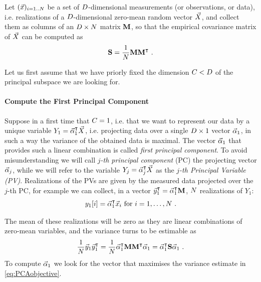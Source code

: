Let $(\vec{x})_{i=1..N}$ be a set of $D$-dimensional measurements (or observations, or data), i.e. realizations of a $D$-dimensional zero-mean random vector $\vec{X}{}$, and collect them as columns of an $D \times N$ matrix $\textbf{M}$, so that the empirical covariance matrix of $\vec{X}{}$ can be computed as 
\begin{equation}\label{eq:covmat}
\textbf{S} = \frac{1}{N}\textbf{M}\textbf{M}^\intercal \mbox{ .}
\end{equation}

Let us first assume that we have priorly fixed the dimension $C<D$ of the principal subspace we are looking for. 

\paragraph*{Compute the First Principal Component}
Suppose in a first time that $C = 1$, i.e. that we want to represent our data by a unique variable $Y_1 =  \vec{\alpha}_1^\intercal \vec{X}{}$, i.e. projecting data over a single $D\times 1$ vector $\vec{\alpha}_1$, in such a way the variance of the obtained data is maximal. The vector $\vec{\alpha}_1$ that provides such a linear combination is called {\em first principal component}. 
To avoid misunderstanding we will call {\em $j$-th principal component} (PC) the projecting vector $\vec{\alpha}_j$, while we will refer to the variable $Y_j = \vec{\alpha}_j^\intercal \vec{X}$ as the {\em $j$-th Principal Variable (PV)}. 
Realizations of the PVs are given by the measured data projected over the $j$-th PC, for example we can collect, in a vector $\vec{y}_1^\intercal = \vec{\alpha}_1^\intercal \textbf{M} $, $N $ realizations of $Y_1$:
\begin{equation}
y_1[i] = \vec{\alpha}_1^\intercal \vec{x}_i \mbox{ for } i=1,\dots , N \mbox{ .}
\end{equation}

The mean of these realizations will be zero as they are linear combinations of zero-mean variables, and the variance turns to be estimable as
\begin{equation}\label{eq:PCAobjective}
\frac{1}{N}\vec{y}_1\vec{y}_1^\intercal = \frac{1}{N}\vec{\alpha}_1^\intercal\textbf{M}\textbf{M}^\intercal\vec{\alpha}_1 = \vec{\alpha}_1^\intercal\textbf{S}\vec{\alpha}_1 \mbox{ .}
\end{equation}
To compute $\vec{\alpha}_1$ we look for the vector that maximises the variance estimate in \eqref{eq:PCAobjective}.\\

